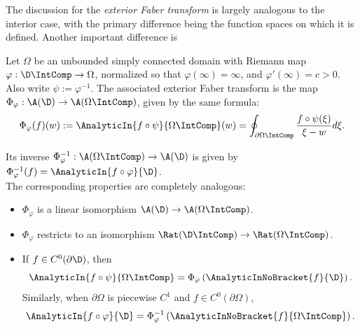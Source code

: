 \documentclass{article}
\numberwithin{equation}{section}
\begin{document}
The discussion for the \emph{exterior Faber transform} is largely analogous to the interior case, with the primary difference being the function spaces on which it is defined. Another important difference is 

\begin{definition}
Let $\Omega$ be an unbounded simply connected domain with Riemann map $\varphi:\D\IntComp\rightarrow\Omega$, normalized so that $\varphi(\infty)=\infty$, and $\varphi'(\infty)=c>0$. Also write $\psi:=\varphi^{-1}$. The associated exterior Faber transform is the map $\Phi_{\varphi}:\A(\D)\rightarrow\A(\Omega\IntComp)$, given by the same formula:
\begin{equation}\label{eqn:ExteriorTransformFormula}
\Phi_{\varphi}(f)(w):=\AnalyticIn{f\circ\psi}{\Omega\IntComp}(w)=\oint_{\partial\Omega\IntComp}\dfrac{f\circ\psi(\xi)}{\xi-w}d\xi.
\end{equation}
\end{definition}
\noindent Its inverse $\Phi_{\varphi}^{-1}:\A(\Omega\IntComp)\rightarrow\A(\D)$ is given by $\Phi_{\varphi}^{-1}(f)=\AnalyticIn{f\circ\varphi}{\D}$.\\

The corresponding properties are completely analogous:
\begin{itemize}
    \item $\Phi_{\varphi}$ is a linear isomorphism $\A(\D)\rightarrow\A(\Omega\IntComp)$.
    \item $\Phi_{\varphi}$ restricts to an isomorphism $\Rat(\D\IntComp)\rightarrow\Rat(\Omega\IntComp)$.
    \item If $f\in C^0(\partial\D)$, then
    \begin{equation}\label{eqn:ExteriorFaberTransformProjectionExtension}
        \AnalyticIn{f\circ\psi}{\Omega\IntComp}=\Phi_\varphi\left(\AnalyticInNoBracket{f}{\D}\right).
    \end{equation}
    Similarly, when $\partial\Omega$ is piecewise $C^1$ and $f\in C^0(\partial\Omega)$,
    \begin{equation}\label{eqn:ExteriorInverseFaberTransformProjectionExtension}
        \AnalyticIn{f\circ\varphi}{\D}=\Phi_{\varphi}^{-1}\left(\AnalyticInNoBracket{f}{\Omega\IntComp}\right).
    \end{equation}
\end{itemize}
\end{document}
